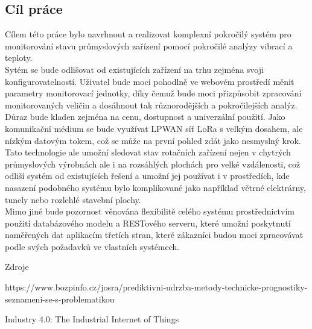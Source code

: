 \subsection{Cíl práce}
    
    Cílem této práce bylo navrhnout a realizovat komplexní pokročilý systém pro monitorování stavu průmyslových zařízení pomocí pokročilé analýzy vibrací a teploty.\\
    Sytém se bude odlišovat od existujících zařízení na trhu zejména svoji konfigurovatelností. Uživatel bude moci pohodlně ve webovém prostředí měnit parametry monitorovací jednotky, díky čemuž bude moci přizpůsobit zpracování monitorovaných veličin a dosáhnout tak různorodějších a pokročilejších analýz.\\
    
    Důraz bude kladen zejména na cenu, dostupnost a univerzální použití. Jako komunikační médium se bude využívat LPWAN síť LoRa s velkým dosahem, ale nízkým datovým tokem, což se může na první pohled zdát jako nesmyslný krok. Tato technologie ale umožní sledovat stav rotačních zařízení nejen v chytrých průmyslových výrobnách ale i na rozsáhlých plochách pro velké vzdálenosti, což odliší systém od existujících řešení a umožní jej používat i v prostředích, kde nasazení podobného systému bylo komplikované jako například větrné elektrárny, tunely nebo rozlehlé stavební plochy.\\
    
    Mimo jiné bude pozornost věnována flexibilitě celého systému prostřednictvím použití databázového modelu a RESTového serveru, které umožní poskytnutí naměřených dat aplikacím třetích stran, které zákazníci budou moci zpracovávat podle svých požadavků ve vlastních systémech.
    
Zdroje

https://www.bozpinfo.cz/josra/prediktivni-udrzba-metody-technicke-prognostiky-seznameni-se-s-problematikou

Industry 4.0: The Industrial Internet of Things

